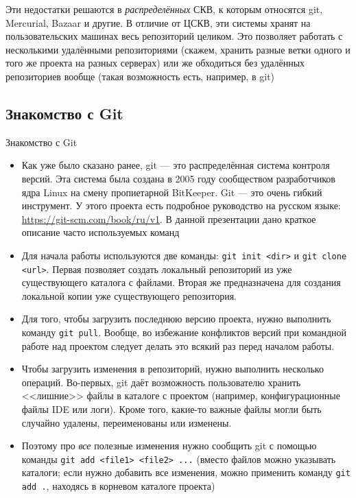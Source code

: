\documentclass{beamer}
\begin{document}
\begin{frame}
	Эти недостатки решаются в \emph{распределённых} СКВ, к которым относятся git, Mercurial, Bazaar и другие. В отличие от ЦСКВ, эти системы хранят на пользовательских машинах весь репозиторий целиком. Это позволяет работать с несколькими удалёнными репозиториями (скажем, хранить разные ветки одного и того же проекта на разных серверах) или же обходиться без удалённых репозиториев вообще (такая возможность есть, например, в git)
\end{frame}

\subsection{Знакомство с Git}

\begin{frame}{Знакомство с Git}
	\begin{itemize}
		\item{Как уже было сказано ранее, git --- это распределённая система контроля версий. Эта система была создана в 2005 году сообществом разработчиков ядра Linux на смену пропиетарной BitKeeper. Git --- это очень гибкий инструмент. У этого проекта есть подробное руководство на русском языке: {\color{blue} \url{https://git-scm.com/book/ru/v1}}. В данной презентации дано краткое описание часто используемых команд}\pause
		\item{Для начала работы используются две команды: \texttt{git init <dir>} и \texttt{git clone <url>}. Первая позволяет создать локальный репозиторий из уже существующего каталога с файлами. Вторая же предназначена для создания локальной копии уже существующего репозитория.}
	\end{itemize}
\end{frame}

\begin{frame}
	\begin{itemize}
		\item{Для того, чтобы загрузить последнюю версию проекта, нужно выполнить команду \texttt{git pull}. Вообще, во избежание конфликтов версий при командной работе над проектом следует делать это всякий раз перед началом работы.}\pause
		\item{Чтобы загрузить изменения в репозиторий, нужно выполнить несколько операций. Во-первых, git даёт возможность пользователю хранить <<лишние>> файлы в каталоге с проектом (например, конфигурационные файлы IDE или логи). Кроме того, какие-то важные файлы могли быть случайно удалены, переименованы или изменены.}\pause
		\item{Поэтому про \emph{все} полезные изменения нужно сообщить git с помощью команды \texttt{git add <file1> <file2> ...} (вместо файлов можно указывать каталоги; если нужно добавить все изменения, можно применить команду \texttt{git add .}, находясь в корневом каталоге проекта)}
	\end{itemize}
\end{frame}
\end{document}
